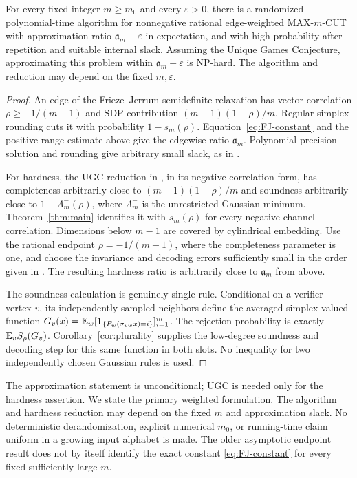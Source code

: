 \begin{corollary}
\label{cor:cut}
For every fixed integer $m\ge m_0$ and every $\varepsilon>0$, there is
a randomized polynomial-time algorithm for nonnegative rational edge-weighted
MAX-$m$-CUT with approximation ratio $\mathfrak a_m-\varepsilon$ in expectation,
and with high probability after repetition and suitable internal slack.
Assuming the Unique Games Conjecture, approximating this problem
within $\mathfrak a_m+\varepsilon$ is NP-hard.
The algorithm and reduction may depend on the fixed $m,\varepsilon$.
\end{corollary}
\begin{proof}
An edge of the Frieze--Jerrum semidefinite relaxation has vector
correlation $\rho\ge-1/(m-1)$ and SDP contribution
$(m-1)(1-\rho)/m$. Regular-simplex rounding cuts it with probability
$1-s_m(\rho)$. Equation~\eqref{eq:FJ-constant} and the positive-range
estimate above give the edgewise ratio $\mathfrak a_m$.
Polynomial-precision solution and rounding give arbitrary small slack,
as in \cite[Appendix~A.3, Theorem~A.6]{IM}.

For hardness, the UGC reduction in \cite[Appendix~A.4]{IM}, in its
negative-correlation form, has completeness arbitrarily close to
$(m-1)(1-\rho)/m$ and soundness arbitrarily close to
$1-\Lambda_m^-(\rho)$, where $\Lambda_m^-$ is the unrestricted
Gaussian minimum. Theorem~\ref{thm:main} identifies it with
$s_m(\rho)$ for every negative channel correlation. Dimensions below
$m-1$ are covered by cylindrical embedding. Use the rational endpoint $\rho=-1/(m-1)$, where the completeness
parameter is one, and choose the invariance and decoding errors sufficiently
small in the order given in \cite{endpointtransfer}. The resulting hardness ratio is arbitrarily
close to $\mathfrak a_m$ from above.

The soundness calculation is genuinely single-rule. Conditional on a
verifier vertex $v$, its independently sampled neighbors define the
averaged simplex-valued function
$G_v(x)=\mathbb E_w[\mathbf 1_{\{F_w(\sigma_{vw}x)=i\}}]_{i=1}^m$.
The rejection probability is exactly $\mathbb E_v S_\rho(G_v)$.
Corollary~\ref{cor:plurality} supplies the low-degree soundness and
decoding step for this same function in both slots. No inequality for
two independently chosen Gaussian rules is used.
\end{proof}

The approximation statement is unconditional; UGC is needed only for
the hardness assertion. We state the primary weighted formulation. The algorithm and hardness
reduction may depend on the fixed $m$ and approximation slack. No
deterministic derandomization, explicit numerical $m_0$, or running-time
claim uniform in a growing input alphabet is made. The older
asymptotic endpoint result \cite[Proposition~11.4]{KKMO} does not by
itself identify the exact constant \eqref{eq:FJ-constant} for every
fixed sufficiently large $m$.
